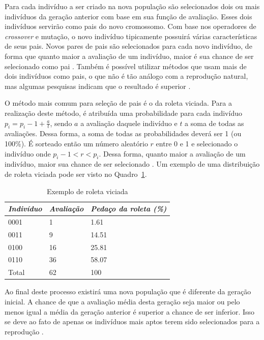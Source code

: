 \documentclass[12pt,oneside,a4paper,english,french,spanish,brazil,]{abntex2}
\begin{document}
Para cada indivíduo a ser criado na nova população são selecionados dois ou mais indivíduos da geração anterior com base em sua função de avaliação. Esses dois indivíduos servirão como pais do novo cromossomo. Com base nos operadores de \textit{crossover} e mutação, o novo indivíduo tipicamente possuirá várias características de seus pais. Novos pares de pais são selecionados para cada novo indivíduo, de forma que quanto maior a avaliação de um indivíduo, maior é sua chance de ser selecionado como pai \cite{linden:2008}. Também é possível utilizar métodos que usam mais de dois indivíduos como pais, o que não é tão análogo com a reprodução natural, mas algumas pesquisas indicam que o resultado é superior \cite{ting:2005} \cite{eiben:1994}.

O método mais comum para seleção de pais é o da roleta viciada. Para a realização deste método, é atribuída uma probabilidade para cada indivíduo \(p_i = p_i-1 + \frac{a}{t}\), sendo \(a\) a avaliação daquele indivíduo e \(t\) a soma de todas as avaliações. Dessa forma, a soma de todas as probabilidades deverá ser 1 (ou 100\%). É sorteado então um número aleatório \(r\) entre 0 e 1 e selecionado o indivíduo onde \(p_i-1 < r < p_i\). Dessa forma, quanto maior a avaliação de um indivíduo, maior sua chance de ser selecionado \cite{linden:2008}. Um exemplo de uma distribuição de roleta viciada pode ser visto no Quadro~\ref{tab:Roleta}.

\begin{table}
\centering
\caption{Exemplo de roleta viciada}
\label{tab:Roleta}
\begin{tabular}{lll}
\hline
\textit{\textbf{Indivíduo}} & \textit{\textbf{Avaliação}} & \textit{\textbf{Pedaço da roleta (\%)}} \\ \hline
0001      & 1         & 1.61                  \\
0011      & 9         & 14.51                 \\ 
0100      & 16        & 25.81                 \\ 
0110      & 36        & 58.07                 \\ 
Total     & 62        & 100                   \\ \hline
\end{tabular}
\end{table}

Ao final deste processo existirá uma nova população que é diferente da geração inicial. A chance de que a avaliação média desta geração seja maior ou pelo menos igual a média da geração anterior é superior a chance de ser inferior. Isso se deve ao fato de apenas os indivíduos mais aptos terem sido selecionados para a reprodução \cite{linden:2008}.
\end{document}
